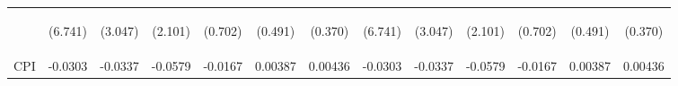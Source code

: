 \documentclass[]{article}
\begin{document}
\begin{center}
\begin{tabular}{lcccccccccccc}
\vspace{4pt} & \begin{footnotesize}(6.741)\end{footnotesize} & \begin{footnotesize}(3.047)\end{footnotesize} & \begin{footnotesize}(2.101)\end{footnotesize} & \begin{footnotesize}(0.702)\end{footnotesize} & \begin{footnotesize}(0.491)\end{footnotesize} & \begin{footnotesize}(0.370)\end{footnotesize} & \begin{footnotesize}(6.741)\end{footnotesize} & \begin{footnotesize}(3.047)\end{footnotesize} & \begin{footnotesize}(2.101)\end{footnotesize} & \begin{footnotesize}(0.702)\end{footnotesize} & \begin{footnotesize}(0.491)\end{footnotesize} & \begin{footnotesize}(0.370)\end{footnotesize} \\
CPI & -0.0303 & -0.0337 & -0.0579 & -0.0167 & 0.00387 & 0.00436 & -0.0303 & -0.0337 & -0.0579 & -0.0167 & 0.00387 & 0.00436 \\

\end{tabular}
\end{center}
\end{document}

